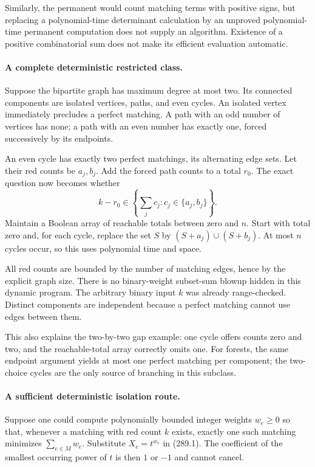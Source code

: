 \documentclass[11pt]{article}
\begin{document}
Similarly, the permanent would count matching terms with positive signs, but replacing a polynomial-time determinant calculation by an unproved polynomial-time permanent computation does not supply an algorithm. Existence of a positive combinatorial sum does not make its efficient evaluation automatic.

\paragraph{A complete deterministic restricted class.}
Suppose the bipartite graph has maximum degree at most two. Its connected components are isolated vertices, paths, and even cycles. An isolated vertex immediately precludes a perfect matching. A path with an odd number of vertices has none; a path with an even number has exactly one, forced successively by its endpoints.

An even cycle has exactly two perfect matchings, its alternating edge sets. Let their red counts be $a_j,b_j$. Add the forced path counts to a total $r_0$. The exact question now becomes whether
\[
 k-r_0\in\left\{\sum_j c_j:c_j\in\{a_j,b_j\}\right\}.
\]
Maintain a Boolean array of reachable totals between zero and $n$. Start with total zero and, for each cycle, replace the set $S$ by
$(S+a_j)\cup(S+b_j)$. At most $n$ cycles occur, so this uses polynomial time and space.

All red counts are bounded by the number of matching edges, hence by the explicit graph size. There is no binary-weight subset-sum blowup hidden in this dynamic program. The arbitrary binary input $k$ was already range-checked. Distinct components are independent because a perfect matching cannot use edges between them.

This also explains the two-by-two gap example: one cycle offers counts zero and two, and the reachable-total array correctly omits one. For forests, the same endpoint argument yields at most one perfect matching per component; the two-choice cycles are the only source of branching in this subclass.

\paragraph{A sufficient deterministic isolation route.}
Suppose one could compute polynomially bounded integer weights $w_e\ge0$ so that, whenever a matching with red count $k$ exists, exactly one such matching minimizes $\sum_{e\in M}w_e$. Substitute $X_e=t^{w_e}$ in (289.1). The coefficient of the smallest occurring power of $t$ is then $1$ or $-1$ and cannot cancel.
\end{document}
